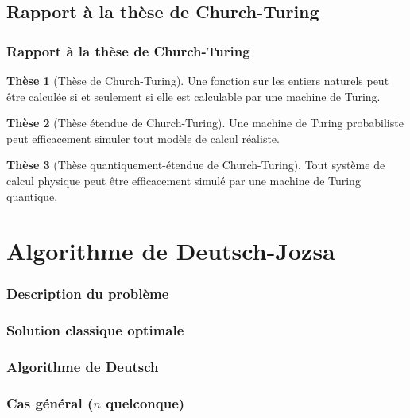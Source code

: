 \documentclass[aspectratio=169]{beamer}
\theoremstyle{plain}
\theoremstyle{definition}
\newtheorem*{thesis}{Thèse}
\begin{document}
\subsection{Rapport à la thèse de Church-Turing}
\begin{frame}
    \frametitle{Rapport à la thèse de Church-Turing}
    \begin{thesis}[Thèse de Church-Turing]
        Une fonction sur les entiers naturels peut être calculée si et seulement si elle est calculable par une machine de Turing.
    \end{thesis}
    \begin{thesis}[Thèse étendue de Church-Turing]
        Une machine de Turing probabiliste peut efficacement simuler tout modèle de calcul réaliste.
    \end{thesis}
    \begin{thesis}[Thèse quantiquement-étendue de Church-Turing]
        Tout système de calcul physique peut être efficacement simulé par une machine de Turing quantique.
    \end{thesis}
\end{frame}

\section{Algorithme de Deutsch-Jozsa}
\begin{frame}
    \frametitle{Description du problème}
\end{frame}

\begin{frame}
    \frametitle{Solution classique optimale}
\end{frame}

\begin{frame}
    \frametitle{Algorithme de Deutsch}
\end{frame}

\begin{frame}
    \frametitle{Cas général ($n$ quelconque)}
\end{frame}
\end{document}
